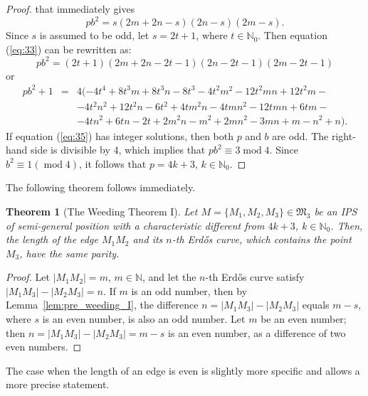 \documentclass[a4paper,14pt]{article} %
\theoremstyle{plain}
\newtheorem{theorem}{Theorem}[section]
\theoremstyle{definition}
\begin{document}
\begin{proof}
	that immediately gives
	\begin{equation}
		\label{eq:33}
		pb^2=s(2m+2n-s)(2n-s)(2m-s).
	\end{equation}
	Since $s$ is assumed to be odd, let $s=2t+1$, where $t\in\mathbb{N}_0$.
	Then equation (\ref{eq:33}) can be rewritten as:
	\begin{equation}
		\label{eq:34.2}
		pb^2=(2t+1)(2m+2n-2t-1)(2n-2t-1)(2m-2t-1)
	\end{equation}
	or
	\begin{eqnarray}
		pb^2+1 &=&4(-4t^4+8t^3m+8t^3n-8t^3-4t^2m^2-12t^2mn+12t^2m- {}\nonumber\\
			 &     &-4t^2n^2+12t^2n-6t^2+4tm^2n-4tmn^2-12tmn+6tm- {}\nonumber\\
			 &     &-4tn^2+6tn-2t+2m^2n-m^2+2mn^2-3mn+m-n^2+n).%
	\label{eq:35}
	\end{eqnarray}
	If equation (\ref{eq:35}) has integer solutions, then both $p$ and $b$ are odd.
	The right-hand side is divisible by 4, which implies that  $pb^2\equiv3\operatorname{mod}{4}$.
	Since $b^{2}\equiv1(\operatorname{mod}4)$, it follows that $p=4k+3$, $k\in \mathbb{N}_{0}$.
\end{proof}

The following theorem follows immediately.

\begin{theorem}[The Weeding Theorem I]
	\label{thm:weeding_I}
	Let $M = \{M_1, M_2, M_3\} \in \mathfrak{M}_3$ be an IPS of semi-general position with a characteristic different from $4k+3$, $k \in \mathbb{N}_0$. Then, the length of the edge $M_1 M_2$ and its $n$-th Erdős curve, which contains the point $M_3$, have the same parity.
\end{theorem}

\begin{proof}
	Let $|M_1 M_2| = m$, $m \in \mathbb{N}$, and let the $n$-th Erdős curve satisfy $|M_1 M_3| - |M_2 M_3| = n$.
	If $m$ is an odd number, then by Lemma~\ref{lem:pre_weeding_I}, the difference $n = |M_1 M_3| - |M_2 M_3|$ equals $m - s$, where $s$ is an even number, is also an odd number.
	Let $m$ be an even number; then $n = |M_1 M_3| - |M_2 M_3| = m - s$ is an even number, as a difference of two even numbers.
\end{proof}

The case when the length of an edge is even is slightly more specific and allows a more precise statement.
\end{document}

